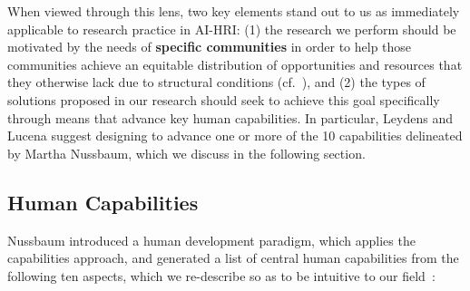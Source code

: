 \documentclass[letterpaper]{article} %
\begin{document}
When viewed through this lens, two key elements stand out to us as immediately applicable to research practice in AI-HRI: (1) the research we perform should be motivated by the needs of \textbf{specific communities} in order to help those communities achieve an equitable distribution of opportunities and resources that they otherwise lack due to structural conditions (cf.~\citet{leydens2014design}), and (2) the types of solutions proposed in our research should seek to achieve this goal specifically through means that advance key human capabilities. In particular, Leydens and Lucena suggest designing to advance one or more of the 10 capabilities delineated by Martha Nussbaum, which we discuss in the following section.

\subsection{Human Capabilities}

Nussbaum introduced a human development paradigm, which applies the capabilities approach, and generated a list of central human capabilities from the following ten aspects, which we re-describe so as to be intuitive to our field~\cite{nussbaum2009creating}:
\end{document}

